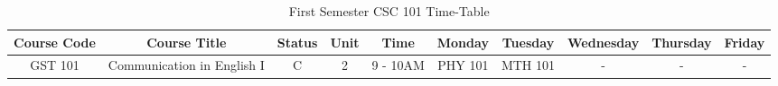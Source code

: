 \documentclass{article}
\begin{document}
	
\begin{sidewaystable}[h]
		\begin{center}
			\caption{First Semester CSC 101 Time-Table}
			\label{tab:table1}
			\begin{tabular}{|c|c|c|c|c|c|c|c|c|c|}
				\textbf{Course Code} & \textbf{Course Title} & \textbf{Status} & \textbf{Unit} & \textbf{Time} & \textbf{Monday} & \textbf{Tuesday} & \textbf{Wednesday} & \textbf{Thursday} & \textbf{Friday}\\
				\hline
				GST 101 & Communication in English I & C & 2 & 9 - 10AM & PHY 101 & MTH 101 & - & - & -\\
			\end{tabular}
		\end{center}
\end{sidewaystable}
\end{document}
